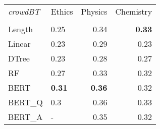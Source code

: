 \begin{tabular}{llrr}
\toprule
\textit{crowdBT} & Ethics &  Physics &  Chemistry \\
  &        &          &            \\
\midrule
Length &   0.25 &     0.34 &       \textbf{0.33} \\
Linear &   0.23 &     0.29 &       0.23 \\
DTree  &   0.23 &     0.28 &       0.27 \\
RF     &   0.27 &     0.33 &       0.32 \\
BERT   &   \textbf{0.31} &     \textbf{0.36} &       0.32 \\
BERT\_Q &    0.3 &     0.36 &       0.33 \\
BERT\_A &      - &     0.35 &       0.32 \\
\bottomrule
\end{tabular}
